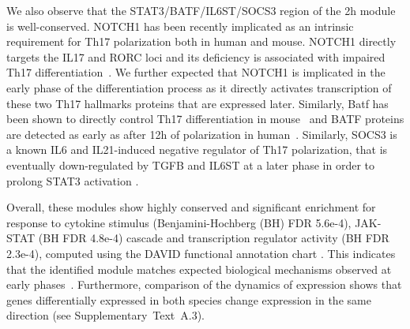 We also observe that the STAT3/BATF/IL6ST/SOCS3 region of the \unit{2}{h} module is well-conserved.
NOTCH1 has been recently implicated as an intrinsic requirement for Th17 polarization both in human and mouse.
NOTCH1 directly targets the IL17 and RORC loci and its deficiency is associated with impaired Th17 differentiation~\parencite{keerthivasan2011notch}.
We further expected that NOTCH1 is implicated in the early phase of the differentiation process as it directly activates transcription of these two Th17 hallmarks proteins that are expressed later.
Similarly, Batf has been shown to directly control Th17 differentiation in mouse~\parencite{schraml2009ap} and BATF proteins are detected as early as after \unit{12}{h} of polarization in human~\parencite{tuomela2012identification}. 
Similarly, SOCS3 is a known IL6 and IL21-induced negative regulator of Th17 polarization, that is eventually down-regulated by TGFB and IL6ST at a later phase in order to prolong STAT3 activation \parencites{zhu2008socs3,qin2009tgf}.

Overall, these modules show highly conserved and significant enrichment for response to cytokine stimulus (Benjamini-Hochberg (BH) FDR 5.6e-4), JAK-STAT (BH FDR 4.8e-4) cascade and transcription regulator activity (BH FDR 2.3e-4), computed using the DAVID functional annotation chart \parencite{huang2008systematic}.
This indicates that the identified module matches expected biological mechanisms observed at early phases~\parencite{ciofani2012validated}.
Furthermore, comparison of the dynamics of expression shows that genes differentially expressed in both species change expression in the same direction (see Supplementary~Text~A.3).



